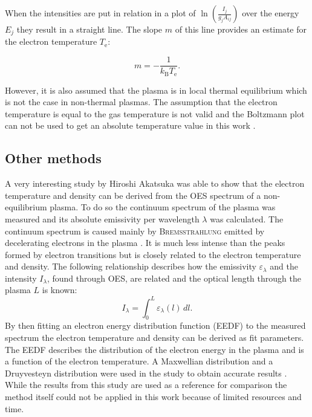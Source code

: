 When the intensities are put in relation in a plot of $ \ln \left( \frac{I_j}{g_j A_{ij}} \right) $ over the energy $ E_j $ they result in a straight line. The slope $ m $ of this line provides an estimate for the electron temperature $ T_\text{e} $:

\begin{equation}
    m = - \frac{1}{k_\text{B} T_\text{e}}.
\end{equation}

However, it is also assumed that the plasma is in local thermal equilibrium which is not the case in non-thermal plasmas. The assumption that the electron temperature is equal to the gas temperature is not valid and the Boltzmann plot can not be used to get an absolute temperature value in this work \cite{plasma2}. 

\subsection{Other methods}
A very interesting study by Hiroshi Akatsuka \cite{oes_temperature} was able to show that the electron temperature and density can be derived from the OES spectrum of a non-equilibrium plasma. To do so the continuum spectrum of the plasma was measured and its absolute emissivity per wavelength $\lambda$ was calculated. The continuum spectrum is caused mainly by \textsc{Bremsstrahlung} emitted by decelerating electrons in the plasma \cite{oes_temperature}. It is much less intense than the peaks formed by electron transitions but is closely related to the electron temperature and density. The following relationship describes how the emissivity $\varepsilon_\lambda$ and the intensity $I_\lambda$, found through OES, are related and the optical length through the plasma $L$ is known:
\begin{equation}
I_\lambda = \int_0^L \varepsilon_\lambda(l) \, dl.
\end{equation}
By then fitting an electron energy distribution function (EEDF) to the measured spectrum the electron temperature and density can be derived as fit parameters. The EEDF describes the distribution of the electron energy in the plasma and is a function of the electron temperature. A Maxwellian distribution and a Druyvesteyn distribution were used in the study to obtain accurate results \cite{oes_temperature}. While the results from this study are used as a reference for comparison the method itself could not be applied in this work because of limited resources and time.  

